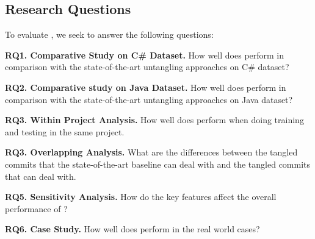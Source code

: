 \subsection{Research Questions}

To evaluate {\tool}, we seek to answer the following questions:

\noindent\textbf{RQ1. Comparative Study on C\# Dataset.}  How well does {\tool} perform in comparison with the state-of-the-art untangling approaches on C\# dataset?

\noindent\textbf{RQ2. Comparative study on Java Dataset.}  How well does {\tool} perform in comparison with the state-of-the-art untangling approaches on Java dataset?

\noindent\textbf{RQ3. Within Project Analysis.}
How well does {\tool} perform when doing training and testing in the same project.

\noindent\textbf{RQ3. Overlapping Analysis.}
What are the differences between the tangled commits that the state-of-the-art baseline can deal with and the tangled commits that {\tool} can deal with.

\noindent\textbf{RQ5. Sensitivity Analysis.} How do the key features affect the overall performance of {\tool}?

\noindent\textbf{RQ6. Case Study.}  How well does {\tool} perform in the real world cases?


